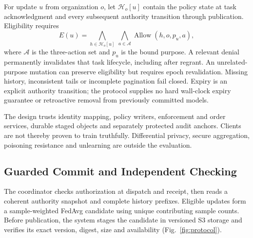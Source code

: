 \documentclass[conference,letterpaper]{IEEEtran}
\begin{document}
For update $u$ from organization $o$, let $\mathcal{H}_o[u]$ contain the policy state at task acknowledgment and every subsequent authority transition through publication. Eligibility requires
\begin{equation}
 E(u)=\bigwedge_{h\in\mathcal{H}_o[u]}\ \bigwedge_{a\in\mathcal{A}}
 \operatorname{Allow}(h,o,p_u,a),
 \label{eq:eligibility}
\end{equation}
where $\mathcal{A}$ is the three-action set and $p_u$ is the bound purpose. A relevant denial permanently invalidates that task lifecycle, including after regrant. An unrelated-purpose mutation can preserve eligibility but requires epoch revalidation. Missing history, inconsistent tails or incomplete pagination fail closed. Expiry is an explicit authority transition; the protocol supplies no hard wall-clock expiry guarantee or retroactive removal from previously committed models.

The design trusts identity mapping, policy writers, enforcement and order services, durable staged objects and separately protected audit anchors. Clients are not thereby proven to train truthfully. Differential privacy, secure aggregation, poisoning resistance and unlearning are outside the evaluation.

\subsection{Guarded Commit and Independent Checking}
The coordinator checks authorization at dispatch and receipt, then reads a coherent authority snapshot and complete history prefixes. Eligible updates form a sample-weighted FedAvg candidate using unique contributing sample counts. Before publication, the system stages the candidate in versioned S3 storage and verifies its exact version, digest, size and availability (Fig.~\ref{fig:protocol}).
\end{document}
